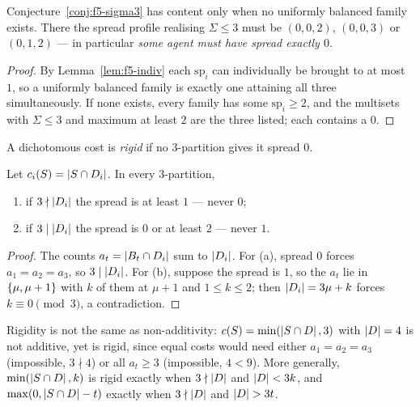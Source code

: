 \begin{corollary}
\label{cor:f5-needzero}
Conjecture~\ref{conj:f5-sigma3} has content only when no uniformly balanced
family exists. There the spread profile realising $\Sigma \le 3$ must be
$(0,0,2)$, $(0,0,3)$ or $(0,1,2)$ --- in particular \emph{some agent must have
spread exactly $0$}.
\end{corollary}

\begin{proof}
By Lemma~\ref{lem:f5-indiv} each $\mathrm{sp}_i$ can individually be brought to
at most $1$, so a uniformly balanced family is exactly one attaining all three
simultaneously. If none exists, every family has some $\mathrm{sp}_i \ge 2$, and
the multisets with $\Sigma \le 3$ and maximum at least $2$ are the three listed;
each contains a $0$.
\end{proof}

\begin{definition}
\label{def:f5-rigidcost}
A dichotomous cost is \emph{rigid} if no $3$-partition gives it spread $0$.
\end{definition}

\begin{lemma}
\label{lem:f5-rigid}
Let $c_i(S) = \left\lvert S \cap D_i\right\rvert$. In every $3$-partition,
\begin{enumerate}
  \item[(a)] if $3 \nmid \left\lvert D_i\right\rvert$ the spread is at least $1$ --- never $0$;
  \item[(b)] if $3 \mid \left\lvert D_i\right\rvert$ the spread is $0$ or at least $2$ --- never
    $1$.
\end{enumerate}
\end{lemma}

\begin{proof}
The counts $a_t = \left\lvert B_t \cap D_i\right\rvert$ sum to $\left\lvert D_i\right\rvert$. For (a), spread $0$
forces $a_1 = a_2 = a_3$, so $3 \mid \left\lvert D_i\right\rvert$. For (b), suppose the spread is
$1$, so the $a_t$ lie in $\left\{\mu,\mu+1\right\}$ with $k$ of them at $\mu+1$ and
$1 \le k \le 2$; then $\left\lvert D_i\right\rvert = 3\mu + k$ forces $k \equiv 0 \pmod 3$, a
contradiction.
\end{proof}

Rigidity is not the same as non-additivity: $c(S) = \min(\left\lvert S \cap D\right\rvert, 3)$
with $\left\lvert D\right\rvert = 4$ is not additive, yet is rigid, since equal costs would need
either $a_1 = a_2 = a_3$ (impossible, $3 \nmid 4$) or all $a_t \ge 3$
(impossible, $4 < 9$). More generally, $\min(\left\lvert S\cap D\right\rvert,k)$ is rigid exactly
when $3 \nmid \left\lvert D\right\rvert$ and $\left\lvert D\right\rvert < 3k$, and $\max(0,\left\lvert S\cap D\right\rvert-t)$ exactly
when $3 \nmid \left\lvert D\right\rvert$ and $\left\lvert D\right\rvert > 3t$.

